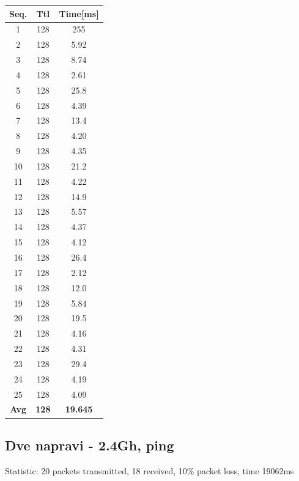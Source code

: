 \documentclass[11pt,a4paper,slovene]{article}
\begin{document}
 \begin{table}[H]
 	\begin{adjustwidth}{-3cm}{-3cm}
	\centering
		\begin{tabular}{c|c|c}
		\hline
		\textbf{Seq.} & \textbf{Ttl} & \textbf{Time[ms]}\\
     		\hline
     		1 & 128 & 255\\
  		2 & 128 & 5.92\\
  		3 & 128 & 8.74\\
  		4 & 128 & 2.61\\
  		5 & 128 & 25.8\\
  		6 & 128 & 4.39\\
  		7 & 128 & 13.4\\
  		8 & 128 & 4.20\\
  		9 & 128 & 4.35\\
  		10 & 128 & 21.2\\
  		11 & 128 & 4.22\\
  		12 & 128 & 14.9\\
  		13 & 128 & 5.57\\
  		14 & 128 & 4.37\\
  		15 & 128 & 4.12\\
  		16 & 128 & 26.4\\
  		17 & 128 & 2.12\\
  		18 & 128 & 12.0\\
  		19 & 128 & 5.84\\
  		20 & 128 & 19.5\\
  		21 & 128 & 4.16\\
  		22 & 128 & 4.31\\
  		23 & 128 & 29.4\\
  		24 & 128 & 4.19\\
  		25 & 128 & 4.09\\
  		\hline
  		\textbf{Avg} & \textbf{128} & \textbf{19.645}\\
  		\hline
    		\end{tabular}
    	\end{adjustwidth}
\end{table}

\subsection{Dve napravi - 2.4Gh, ping}

Statistic: 20 packets transmitted, 18 received, 10\% packet loss, time 19062ms
 
\end{document}
